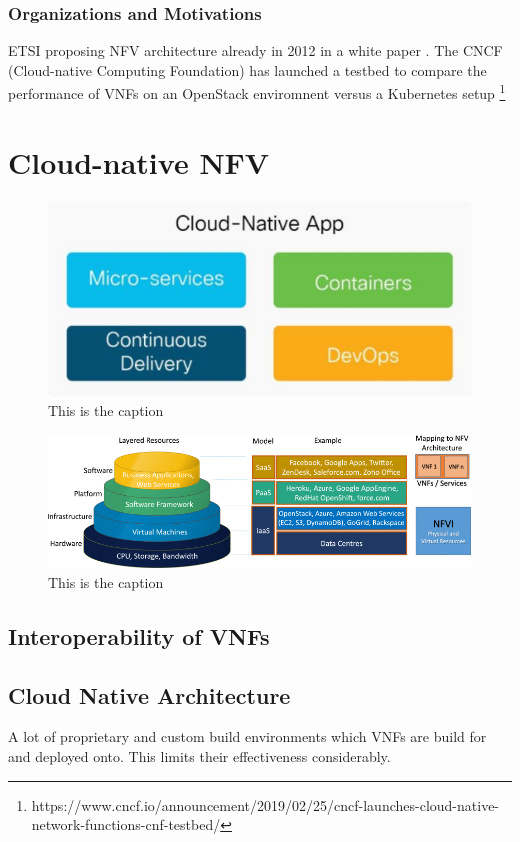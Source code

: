 \subsubsection{Organizations and Motivations}
ETSI proposing NFV architecture already in 2012 in a white paper  \cite{nfv_wp}. The CNCF (Cloud-native Computing Foundation) has launched a testbed to compare the performance of VNFs on an OpenStack enviromnent versus a Kubernetes setup \footnote{https://www.cncf.io/announcement/2019/02/25/cncf-launches-cloud-native-network-functions-cnf-testbed/}	


\section{Cloud-native NFV}

\begin{figure}
	\centering
	\includegraphics[width=0.75\linewidth]{images/cloudNativeApp.png}
	\caption{This is the caption \cite{CNF}}
	\label{img:cloudNativeApp}
\end{figure}

\begin{figure}
	\centering
	\includegraphics[width=1\linewidth]{images/arch.png}
	\caption{This is the caption \cite{mijumbi2016network}}
	\label{img:arch}
\end{figure}



\subsection{Interoperability of VNFs}
\subsection{Cloud Native Architecture}
A lot of proprietary and custom build environments which VNFs are build for and deployed onto. This limits their effectiveness considerably.
